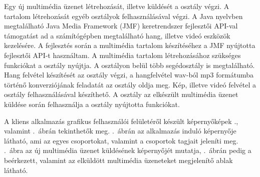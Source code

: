 \medskip

Egy új multimédia üzenet létrehozását, illetve küldését a  osztály végzi. A tartalom létrehozását egyéb osztályok felhasználásával végzi. A Java nyelvben megtalálható Java Media Framework (JMF) keretrendszer \cite{jmf} fejlesztői API-val támogatást ad a számítógépben megtalálható hang, illetve videó eszközök kezelésére. A fejlesztés során a multimédia tartalom készítéséhez a JMF nyújtotta fejlesztői API-t használtam. A multimédia tartalom létrehozásához szükséges funkciókat a  osztály nyújtja. A  osztályon belül több segédosztály is megtalálható. Hang felvétel készítését az  osztály végzi, a hangfelvétel wav-ból mp3 formátumba történő konverziójának feladatát az  osztály oldja meg. Kép, illetve videó felvétel a  osztály felhasználásával készíthető. A  osztály az elkészült multimédia üzenet küldése során felhasználja a  osztály nyújtotta funkciókat.

\medskip

A kliens alkalmazás grafikus felhasználói felületéről készült képernyőképek ., valamint .~ábrán tekinthetők meg. .~ábrán az alkalmazás induló képernyője látható, ami az egyes csoportokat, valamint a csoportok tagjait jeleníti meg. .~ábra az új multimédia üzenet küldésének képernyőjét mutatja, .~ábrán pedig a beérkezett, valamint az elküldött multimédia üzeneteket megjelenítő ablak látható.

